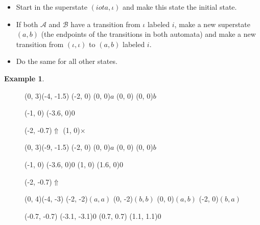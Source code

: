 \documentclass{article}
\theoremstyle{definition}
\newtheorem{example}[theorem]{Example}
\begin{document}
\begin{itemize}
\item Start in the superstate $(iota, \iota)$ and make this state the 
      initial state.
\item If both $\mathcal{A}$ and $\mathcal{B}$ have a transition from $\iota$ 
      labeled $i$, make a new superstate $(a, b)$ (the endpoints of the 
      transitions in both automata) and make a new transition from 
      $(\iota, \iota)$ to $(a, b)$ labeled $i$.
\item Do the same for all other states.
\end{itemize}

\begin{example}
\begin{figure}[H]
\begin{graph}(0, 3)(-4, -1.5)
  (-2, 0) (0, 0){$a$}
  (0, 0)  (0, 0){$b$}

  (-1, 0) \freetext(-3.6, 0){0}
   
   

  \freetext(-2, -0.7){$\Uparrow$}
  \freetext(1, 0){$\times$}
\end{graph}
\begin{graph}(0, 3)(-9, -1.5)
  (-2, 0) (0, 0){$a$}
  (0, 0)  (0, 0){$b$}

  (-1, 0) \freetext(-3.6, 0){0}
   
   
  (1, 0) \freetext(1.6, 0){0}

  \freetext(-2, -0.7){$\Uparrow$}
\end{graph}

\begin{graph}(0, 4)(-4, -3)
  (-2, -2){$(a, a)$}
  (0, -2){$(b, b)$}
  (0, 0){$(a, b)$}
  (-2, 0){$(b, a)$}

  (-0.7, -0.7) \freetext(-3.1, -3.1){0}
   
   
  (0.7, 0.7) \freetext(1.1, 1.1){0}
   
   


\end{graph}
\end{figure}
\end{example}
\end{document}
